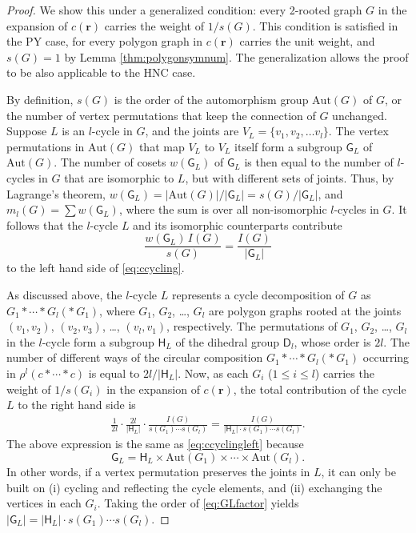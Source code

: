 \documentclass[aip,jcp,reprint,superscriptaddress]{revtex4-1}
\newcommand{\vct}[1]{\mathbf{#1}}
\providecommand{\vr}{} %
\renewcommand{\vr}{\vct{r}}
\newcommand{\G}{\mathsf{G}}
\newcommand{\D}{\mathsf{D}}
\newcommand{\Hgroup}{\mathsf{H}}
\newcommand{\Aut}{\mathrm{Aut}}
\begin{document}
\begin{proof}
We show this under a generalized condition:
every 2-rooted graph $G$ in the expansion of $c(\vr)$
carries the weight of $1/s(G)$.
%
This condition is satisfied in the PY case,
for every polygon graph in $c(\vr)$
carries the unit weight,
and $s(G) = 1$ by Lemma \ref{thm:polygonsymnum}.
%
The generalization
allows the proof to be also applicable to the HNC case. %


By definition,
$s(G)$ is the order of the automorphism group $\Aut(G)$ of $G$,
or the number of vertex permutations that keep the connection of $G$ unchanged.
%
Suppose $L$ is an $l$-cycle in $G$,
and the joints are $V_L = \{v_1, v_2, \dots v_l\}$.
%
The vertex permutations in $\Aut(G)$ that
map $V_L$ to $V_L$ itself %
form a subgroup $\G_L$ of $\Aut(G)$.
%
The number of cosets $w(\G_L)$ of $\G_L$
is then equal to the number of $l$-cycles in $G$
that are isomorphic to $L$,
but with different sets of joints.
%
Thus, by Lagrange's theorem,
$w(\G_L) = |\Aut(G)|/|\G_L| = s(G)/|\G_L|$,
%
and
$m_l(G) = \sum w(\G_L)$,
where the sum is over all non-isomorphic $l$-cycles in $G$.
%
It follows that the $l$-cycle $L$
and its isomorphic counterparts
contribute
\begin{equation}
  \frac{ w(\G_L) \, I(G) }{ s(G) }
= \frac{ I(G) }{ |\G_L|}
\label{eq:ccyclingleft}
\end{equation}
to the left hand side of \eqref{eq:ccycling}.


As discussed above,
the $l$-cycle $L$ represents a cycle decomposition of $G$
as $G_1 * \cdots * G_l (* \, G_1)$,
where $G_1$, $G_2$, \dots, $G_l$ are polygon graphs
rooted at the joints
$(v_1, v_2)$, $(v_2, v_3)$, \dots, $(v_l, v_1)$, respectively.
%
The permutations of $G_1$, $G_2$, \dots, $G_l$ in the $l$-cycle
form a subgroup $\Hgroup_L$ of the dihedral group $\D_l$,
whose order is $2l$.
%
The number of different ways of the circular composition
$G_1 * \cdots * G_l (*\, G_1)$
occurring in $\rho^l (c * \cdots * c)$ is equal to $2l / |\Hgroup_L|$.
%
Now, as each $G_i$ ($1 \le i \le l$)
carries the weight of $1/s(G_i)$ in the expansion of $c(\vr)$,
the total contribution of the cycle $L$
to the right hand side is
\begin{align*}
  \frac{1}{2l}
  \cdot
  \frac{2l}{|\Hgroup_L|}
  \cdot
  \frac{I(G)}{ s(G_1) \cdots s(G_l)}
= \frac{ I(G) }
 { |\Hgroup_L| \cdot s(G_1) \cdots s(G_l) }.
\end{align*}
The above expression is the same as \eqref{eq:ccyclingleft}
because
\begin{equation}
  \G_L = \Hgroup_L \times \Aut(G_1) \times \cdots \times \Aut(G_l).
  \label{eq:GLfactor}
\end{equation}
%
In other words,
if a vertex permutation preserves the joints in $L$,
it can only be built on
(i) cycling and reflecting the cycle elements, and
(ii) exchanging the vertices in each $G_i$.
Taking the order of \eqref{eq:GLfactor} yields
$|\G_L| = |\Hgroup_L| \cdot s(G_1) \cdots s(G_l)$.
\end{proof}
\end{document}
